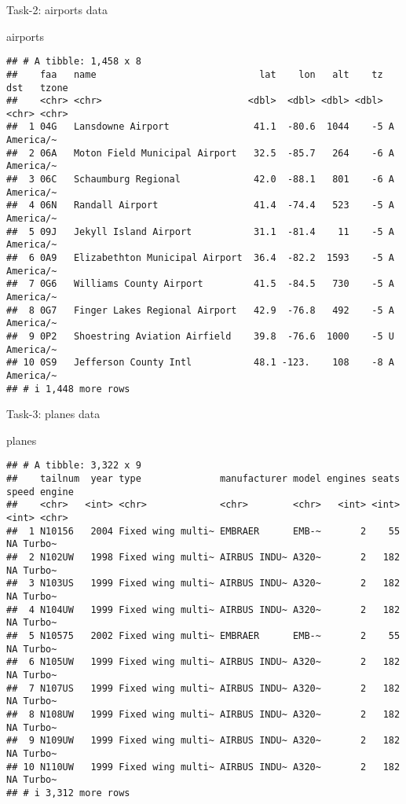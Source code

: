 \documentclass[
]{article}
\newenvironment{Shaded}{\begin{snugshade}}{\end{snugshade}}
\newcommand{\NormalTok}[1]{#1}
\begin{document}
Task-2: airports data

\begin{Shaded}
\begin{Highlighting}[]
\NormalTok{airports}
\end{Highlighting}
\end{Shaded}

\begin{verbatim}
## # A tibble: 1,458 x 8
##    faa   name                             lat    lon   alt    tz dst   tzone    
##    <chr> <chr>                          <dbl>  <dbl> <dbl> <dbl> <chr> <chr>    
##  1 04G   Lansdowne Airport               41.1  -80.6  1044    -5 A     America/~
##  2 06A   Moton Field Municipal Airport   32.5  -85.7   264    -6 A     America/~
##  3 06C   Schaumburg Regional             42.0  -88.1   801    -6 A     America/~
##  4 06N   Randall Airport                 41.4  -74.4   523    -5 A     America/~
##  5 09J   Jekyll Island Airport           31.1  -81.4    11    -5 A     America/~
##  6 0A9   Elizabethton Municipal Airport  36.4  -82.2  1593    -5 A     America/~
##  7 0G6   Williams County Airport         41.5  -84.5   730    -5 A     America/~
##  8 0G7   Finger Lakes Regional Airport   42.9  -76.8   492    -5 A     America/~
##  9 0P2   Shoestring Aviation Airfield    39.8  -76.6  1000    -5 U     America/~
## 10 0S9   Jefferson County Intl           48.1 -123.    108    -8 A     America/~
## # i 1,448 more rows
\end{verbatim}

Task-3: planes data

\begin{Shaded}
\begin{Highlighting}[]
\NormalTok{planes }
\end{Highlighting}
\end{Shaded}

\begin{verbatim}
## # A tibble: 3,322 x 9
##    tailnum  year type              manufacturer model engines seats speed engine
##    <chr>   <int> <chr>             <chr>        <chr>   <int> <int> <int> <chr> 
##  1 N10156   2004 Fixed wing multi~ EMBRAER      EMB-~       2    55    NA Turbo~
##  2 N102UW   1998 Fixed wing multi~ AIRBUS INDU~ A320~       2   182    NA Turbo~
##  3 N103US   1999 Fixed wing multi~ AIRBUS INDU~ A320~       2   182    NA Turbo~
##  4 N104UW   1999 Fixed wing multi~ AIRBUS INDU~ A320~       2   182    NA Turbo~
##  5 N10575   2002 Fixed wing multi~ EMBRAER      EMB-~       2    55    NA Turbo~
##  6 N105UW   1999 Fixed wing multi~ AIRBUS INDU~ A320~       2   182    NA Turbo~
##  7 N107US   1999 Fixed wing multi~ AIRBUS INDU~ A320~       2   182    NA Turbo~
##  8 N108UW   1999 Fixed wing multi~ AIRBUS INDU~ A320~       2   182    NA Turbo~
##  9 N109UW   1999 Fixed wing multi~ AIRBUS INDU~ A320~       2   182    NA Turbo~
## 10 N110UW   1999 Fixed wing multi~ AIRBUS INDU~ A320~       2   182    NA Turbo~
## # i 3,312 more rows
\end{verbatim}
\end{document}
